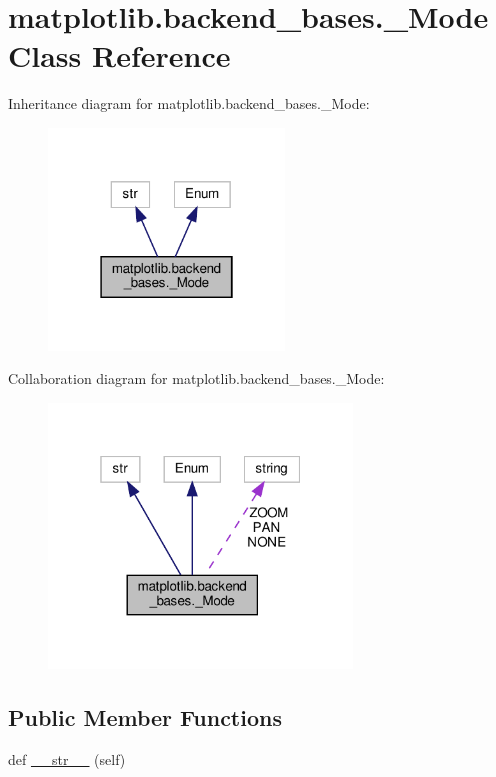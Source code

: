 \hypertarget{classmatplotlib_1_1backend__bases_1_1__Mode}{}\section{matplotlib.\+backend\+\_\+bases.\+\_\+\+Mode Class Reference}
\label{classmatplotlib_1_1backend__bases_1_1__Mode}


Inheritance diagram for matplotlib.\+backend\+\_\+bases.\+\_\+\+Mode\+:
\nopagebreak
\begin{figure}[H]
\begin{center}
\leavevmode
\includegraphics[width=178pt]{classmatplotlib_1_1backend__bases_1_1__Mode__inherit__graph}
\end{center}
\end{figure}


Collaboration diagram for matplotlib.\+backend\+\_\+bases.\+\_\+\+Mode\+:
\nopagebreak
\begin{figure}[H]
\begin{center}
\leavevmode
\includegraphics[width=229pt]{classmatplotlib_1_1backend__bases_1_1__Mode__coll__graph}
\end{center}
\end{figure}
\subsection*{Public Member Functions}
\begin{DoxyCompactItemize}
\item 
def \hyperlink{classmatplotlib_1_1backend__bases_1_1__Mode_a80d8df2886ff85c08322a99c84a183c3}{\+\_\+\+\_\+str\+\_\+\+\_\+} (self)
\end{DoxyCompactItemize}
